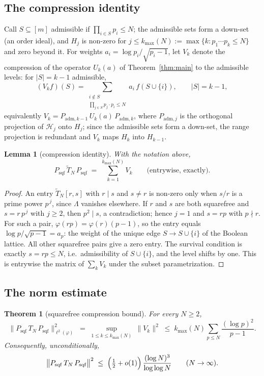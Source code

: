 \documentclass[11pt]{article}
\newtheorem{theorem}{Theorem}
\newtheorem{lemma}{Lemma}
\theoremstyle{remark}
\begin{document}
\subsection{The compression identity}
Call $S\subseteq[m]$ admissible if $\prod_{i\in S}p_i\le N$; the
admissible sets form a down-set (an order ideal), and $H_j$ is
non-zero for $j\le k_{\max}(N):=\max\{k: p_1\cdots p_k\le N\}$ and zero
beyond it. For weights $a_i=\log p_i/\sqrt{p_i-1}$, let $V_k$ denote the
compression of the operator $U_k(a)$ of Theorem~\ref{thm:main} to the
admissible levels: for $|S|=k-1$ admissible,
\[
(V_k f)(S)=\sum_{\substack{i\notin S\\ \prod_{j\in S}p_j\cdot p_i\le N}}
a_i\, f(S\cup\{i\}),\qquad |S|=k-1,
\]
equivalently $V_k=P_{\mathrm{adm},k-1}\,U_k(a)\,P_{\mathrm{adm},k}$, where
$P_{\mathrm{adm},j}$ is the orthogonal projection of $\mathcal H_j$ onto
$H_j$; since the admissible sets form a down-set, the range projection is
redundant and $V_k$ maps $H_k$ into $H_{k-1}$.


\begin{lemma}[compression identity]\label{lem:compression}
With the notation above,
\[
P_{\mathrm{sqf}}\,\widetilde T_N\,P_{\mathrm{sqf}}
\;=\;\sum_{k=1}^{k_{\max}(N)} V_k
\qquad\text{(entrywise, exactly).}
\]
\end{lemma}

\begin{proof}
An entry $\widetilde T_N[r,s]$ with $r\mid s$ and $s\ne r$ is non-zero only
when $s/r$ is a prime power $p^{\,j}$, since $\Lambda$ vanishes elsewhere.
If $r$ and $s$ are both squarefree and $s=r\,p^{\,j}$ with $j\ge 2$, then
$p^2\mid s$, a contradiction; hence $j=1$ and $s=rp$ with $p\nmid r$. For
such a pair, $\varphi(rp)=\varphi(r)(p-1)$, so the entry equals
$\log p/\sqrt{p-1}=a_p$: the weight of the unique edge $S\to S\cup\{i\}$
of the Boolean lattice. All other squarefree pairs give a zero entry. The
survival condition is exactly $s=rp\le N$, i.e.\ admissibility of
$S\cup\{i\}$, and the level shifts by one. This is entrywise the matrix of
$\sum_k V_k$ under the subset parametrization.
\end{proof}

\subsection{The norm estimate}

\begin{theorem}[squarefree compression bound]\label{thm:arithmetic}
For every $N\ge 2$,
\[
\bigl\|P_{\mathrm{sqf}}\,T_N\,P_{\mathrm{sqf}}\bigr\|_{\ell^2(\varphi)}^2
\;=\;\sup_{1\le k\le k_{\max}(N)}\ \|V_k\|^2
\;\le\; k_{\max}(N)\sum_{p\le N}\frac{(\log p)^2}{p-1}.
\]
Consequently, unconditionally,
\[
\bigl\|P_{\mathrm{sqf}}\,T_N\,P_{\mathrm{sqf}}\bigr\|^2
\;\le\;\Bigl(\tfrac12+o(1)\Bigr)\,\frac{(\log N)^3}{\log\log N}
\qquad (N\to\infty).
\]
\end{theorem}
\end{document}
